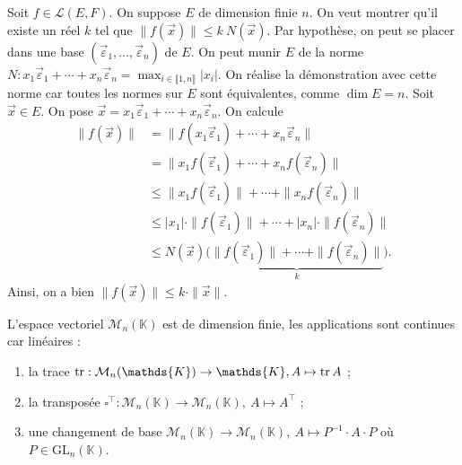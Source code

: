 \begin{prv}
	Soit $f \in \mathcal{L}(E, F)$. On suppose $E$\/ de dimension finie $n$.
	On veut montrer qu'il existe un réel $k$\/ tel que $\|f(\vec{x})\| \le k\:N(\vec{x})$.
	Par hypothèse, on peut se placer dans une base $(\vec{\varepsilon}_1, \ldots, \vec{\varepsilon}_n)$\/ de $E$.
	On peut munir $E$\/ de la norme $N : x_1\vec{\varepsilon}_1 + \cdots + x_n \vec{\varepsilon}_n = \max_{i \in \llbracket 1,n \rrbracket} |x_i|$.
	On réalise la démonstration avec cette norme car toutes les normes sur $E$\/ sont équivalentes, comme $\dim E = n$.
	Soit $\vec{x} \in E$. On pose $\vec{x} = x_1 \vec{\varepsilon}_1 + \cdots + x_n \vec{\varepsilon}_n$.
	On calcule
	\begin{align*}
		\|f(\vec{x})\| &= \|f(x_1 \vec{\varepsilon}_1) + \cdots + x_n \vec{\varepsilon}_n\|\\
		&= \|x_1 f(\vec{\varepsilon}_1) + \cdots + x_n f(\vec{\varepsilon}_n)\| \\
		&\le \|x_1 f(\vec{\varepsilon}_1)\| + \cdots + \|x_n f(\vec{\varepsilon}_n)\|\\
		&\le |x_1|\cdot  \|f(\vec{\varepsilon}_1)\| + \cdots + |x_n|\cdot \|f(\vec{\varepsilon}_n)\|\\
		&\le N(\vec{x}) \big(\underbrace{\|f(\vec{\varepsilon}_1)\| + \cdots + \|f(\vec{\varepsilon}_n)\|}_k\big).
	\end{align*}
	Ainsi, on a bien $\|f(\vec{x})\| \le k \cdot \|\vec{x}\|$.
\end{prv}

\begin{exm}
	L'espace vectoriel $\mathcal{M}_n(\mathds{K})$\/ est de dimension finie, les applications sont continues car linéaires :
	\begin{enumerate}
		\item la trace $\tr : \mathcal{M}_{n}(\mathds{K}) \to \mathds{K}, A \mapsto \tr A$\/ ;
		\item la transposée $\square ^\top : \mathcal{M}_n(\mathds{K}) \to \mathcal{M}_n(\mathds{K}),\: A \mapsto A^\top$\/ ;
		\item une changement de base $\mathcal{M}_n(\mathds{K}) \to \mathcal{M}_n(\mathds{K}),\: A \mapsto P^{-1} \cdot A \cdot P$\/ où $P \in \mathrm{GL}_n(\mathds{K})$.
	\end{enumerate}
\end{exm}

